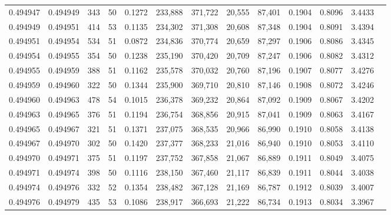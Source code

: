 \begin{tabular}{rrrrrrrrrrrrr}
0.494947 & 0.494949 &   343 &  50 &                                     0.1272 & 233,888 & 371,722 &  20,555 &  87,401 & 0.1904 & 0.8096 & 3.4433 \\
0.494949 & 0.494951 &   414 &  53 &                                     0.1135 & 234,302 & 371,308 &  20,608 &  87,348 & 0.1904 & 0.8091 & 3.4394 \\
0.494951 & 0.494954 &   534 &  51 &                                     0.0872 & 234,836 & 370,774 &  20,659 &  87,297 & 0.1906 & 0.8086 & 3.4345 \\
0.494954 & 0.494955 &   354 &  50 &                                     0.1238 & 235,190 & 370,420 &  20,709 &  87,247 & 0.1906 & 0.8082 & 3.4312 \\
0.494955 & 0.494959 &   388 &  51 &                                     0.1162 & 235,578 & 370,032 &  20,760 &  87,196 & 0.1907 & 0.8077 & 3.4276 \\
0.494959 & 0.494960 &   322 &  50 &                                     0.1344 & 235,900 & 369,710 &  20,810 &  87,146 & 0.1908 & 0.8072 & 3.4246 \\
0.494960 & 0.494963 &   478 &  54 &                                     0.1015 & 236,378 & 369,232 &  20,864 &  87,092 & 0.1909 & 0.8067 & 3.4202 \\
0.494963 & 0.494965 &   376 &  51 &                                     0.1194 & 236,754 & 368,856 &  20,915 &  87,041 & 0.1909 & 0.8063 & 3.4167 \\
0.494965 & 0.494967 &   321 &  51 &                                     0.1371 & 237,075 & 368,535 &  20,966 &  86,990 & 0.1910 & 0.8058 & 3.4138 \\
0.494967 & 0.494970 &   302 &  50 &                                     0.1420 & 237,377 & 368,233 &  21,016 &  86,940 & 0.1910 & 0.8053 & 3.4110 \\
0.494970 & 0.494971 &   375 &  51 &                                     0.1197 & 237,752 & 367,858 &  21,067 &  86,889 & 0.1911 & 0.8049 & 3.4075 \\
0.494971 & 0.494974 &   398 &  50 &                                     0.1116 & 238,150 & 367,460 &  21,117 &  86,839 & 0.1911 & 0.8044 & 3.4038 \\
0.494974 & 0.494976 &   332 &  52 &                                     0.1354 & 238,482 & 367,128 &  21,169 &  86,787 & 0.1912 & 0.8039 & 3.4007 \\
0.494976 & 0.494979 &   435 &  53 &                                     0.1086 & 238,917 & 366,693 &  21,222 &  86,734 & 0.1913 & 0.8034 & 3.3967 \\

\end{tabular}
